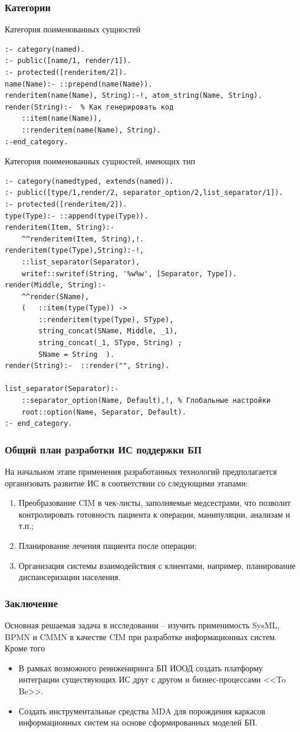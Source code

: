 \documentclass[10pt]{beamer}
\begin{document}
\begin{frame}[fragile]
  \frametitle{Категории}
  Категория поименованных сущностей
\begin{verbatim}
:- category(named).
:- public([name/1, render/1]).
:- protected([renderitem/2]).
name(Name):- ::prepend(name(Name)).
renderitem(name(Name), String):-!, atom_string(Name, String).
render(String):-  % Как генерировать код
    ::item(name(Name)),
    ::renderitem(name(Name), String).
:-end_category.
\end{verbatim}
Категория поименованных сущностей, имеющих тип
\begin{verbatim}
:- category(namedtyped, extends(named)).
:- public([type/1,render/2, separator_option/2,list_separator/1]).
:- protected([renderitem/2]).
type(Type):- ::append(type(Type)).
renderitem(Item, String):-
    ^^renderitem(Item, String),!.
renderitem(type(Type),String):-!,
    ::list_separator(Separator),
    writef::swritef(String, '%w%w', [Separator, Type]).
render(Middle, String):-
    ^^render(SName),
    (   ::item(type(Type)) ->
        ::renderitem(type(Type), SType),
        string_concat(SName, Middle, _1),
        string_concat(_1, SType, String) ;
        SName = String  ).
render(String):-  ::render("", String).

list_separator(Separator):-
    ::separator_option(Name, Default),!, % Глобальные настройки
    root::option(Name, Separator, Default).
:- end_category.

\end{verbatim}
\end{frame}

\begin{frame}
  \frametitle{Общий план разработки ИС поддержки БП}
  На начальном этапе применения разработанных технологий предполагается организовать развитие ИС в соответствии со следующими этапами:
  \begin{enumerate}
  \item Преобразование CIM в чек-листы, заполняемые медсестрами, что позволит контролировать готовность пациента к операции, манипуляции, анализам и т.п.;
  \item Планирование лечения пациента после операции;
  \item Организация системы взаимодействия с клиентами, например, планирование диспансеризации населения.
  \end{enumerate}
\end{frame}

\begin{frame}
  \frametitle{Заключение}
  Основная решаемая задача в исследовании -- изучить применимость SysML, BPMN и CMMN в качестве CIM при разработке информационных систем. Кроме того
  \begin{itemize}
  \item В рамках возможного реинжениринга БП ИООД создать платформу интеграции существующих ИС друг с другом и бизнес-процессами <<To Be>>.
  \item Создать инструментальные средства MDA для порождения каркасов информационных систем на основе сформированных моделей БП.
  \end{itemize}
\end{frame}
\end{document}
